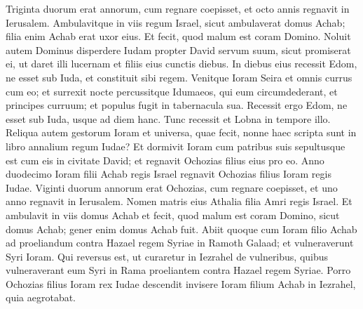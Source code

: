\begin{biblechapter}
\verse Triginta duorum erat annorum, cum regnare coepisset, et octo annis regnavit in Ierusalem. 
\verse Ambulavitque in viis regum Israel, sicut ambulaverat domus Achab; filia enim Achab erat uxor eius. Et fecit, quod malum est coram Domino. 
\verse Noluit autem Dominus disperdere Iudam propter David servum suum, sicut promiserat ei, ut daret illi lucernam et filiis eius cunctis diebus. 
\verse In diebus eius recessit Edom, ne esset sub Iuda, et constituit sibi regem.  
\verse Venitque Ioram Seira et omnis currus cum eo; et surrexit nocte percussitque Idumaeos, qui eum circumdederant, et principes curruum; et populus fugit in tabernacula sua. 
\verse Recessit ergo Edom, ne esset sub Iuda, usque ad diem hanc. Tunc recessit et Lobna in tempore illo. 
\verse Reliqua autem gestorum Ioram et universa, quae fecit, nonne haec scripta sunt in libro annalium regum Iudae? 
\verse Et dormivit Ioram cum patribus suis sepultusque est cum eis in civitate David; et regnavit Ochozias filius eius pro eo. 
\verse Anno duodecimo Ioram filii Achab regis Israel regnavit Ochozias filius Ioram regis Iudae. 
\verse Viginti duorum annorum erat Ochozias, cum regnare coepisset, et uno anno regnavit in Ierusalem. Nomen matris eius Athalia filia Amri regis Israel. 
\verse Et ambulavit in viis domus Achab et fecit, quod malum est coram Domino, sicut domus Achab; gener enim domus Achab fuit. 
\verse Abiit quoque cum Ioram filio Achab ad proeliandum contra Hazael regem Syriae in Ramoth Galaad; et vulneraverunt Syri Ioram. 
\verse Qui reversus est, ut curaretur in Iezrahel de vulneribus, quibus vulneraverant eum Syri in Rama proeliantem contra Hazael regem Syriae. Porro Ochozias filius Ioram rex Iudae descendit invisere Ioram filium Achab in Iezrahel, quia aegrotabat. 
\end{biblechapter}

